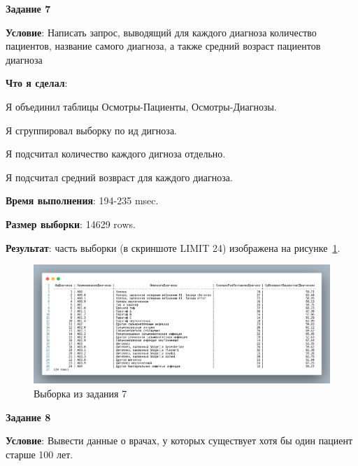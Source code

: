 \newpage


\begin{center}
  \textbf{Задание 7}
\end{center}
  
\textbf{Условие}:
Написать запрос, выводящий для каждого диагноза количество пациентов, название
самого диагноза, а также средний возраст пациентов диагноза

\textbf{Что я сделал}:

Я объединил таблицы Осмотры-Пациенты, Осмотры-Диагнозы.

Я сгруппировал выборку по ид дигноза.

Я подсчитал количество каждого дигноза отдельно.

Я подсчитал средний возвраст для каждого диагноза.



\textbf{Время выполнения}: 194-235 msec.

\textbf{Размер выборки}: 14629 rows.

\textbf{Результат}: часть выборки (в скриншоте LIMIT 24) изображена на рисунке~\ref{fig:t7}.

\begin{figure}[!h]
  \centering

  \includegraphics[width=16cm]
  {../sql/task7/7-out.png}

  \caption{Выборка из задания 7}

  \label{fig:t7}
\end{figure}

\newpage


\begin{center}
  \textbf{Задание 8}
\end{center}
  
\textbf{Условие}:
Вывести данные о врачах, у которых существует хотя бы один пациент старше 100 лет.

